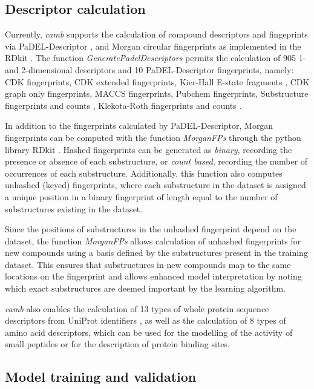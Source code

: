 \documentclass{bioinfo}
\begin{document}
\subsection{Descriptor calculation} 

Currently, {\it camb} supports the calculation of compound descriptors and fingeprints via PaDEL-Descriptor \citep{padel},
and Morgan circular fingerprints \citep{extended_fp} as implemented in the RDkit \citep{rdkit}.
The function {\it GeneratePadelDescriptors} permits the calculation of 905 1- and 2-dimensional descriptors and 10 PaDEL-Descriptor fingerprints, namely: 
CDK fingerprints, CDK extended fingerprints, Kier-Hall E-state fragments \cite{state_fp}, CDK graph only fingerprints, MACCS fingerprints,
Pubchem fingerprints, Substructure fingerprints and counts \citep{obabel}, Klekota-Roth fingerprints and counts \citep{privileged_substructures}.

In addition to the fingerprints calculated by PaDEL-Descriptor, Morgan fingerprints can be computed with the function {\it MorganFPs} through the python library RDkit \citep{rdkit}.
Hashed fingerprints can be generated as \textit{binary}, recording the presence or absence of each substructure,
 or \textit{count based}, recording the number of occurrences of each substructure.
Additionally, this function also computes unhashed (keyed) fingerprints, 
where each substructure in the dataset is assigned a unique position in a binary fingerprint of length equal to the number of substructures existing in the dataset.

Since the positions of substructures in the unhashed fingerprint depend on the dataset, the function {\it MorganFPs} allows calculation of unhashed fingerprints for new compounds using a basis defined by the substructures present in the training dataset. This ensures that substructures in new compounds map to the same locations on the fingerprint and allows enhanced model interpretation by noting which exact substructures are deemed important by the learning algorithm.

{\it camb} also enables the calculation of 13 types of whole protein sequence descriptors
from UniProt identifiers \citep{protr},
as well as the calculation of 8 types of amino acid descriptors,
which can be used for the modelling of the activity of small peptides
or for the description of protein binding sites\citep{AA_benchmark}.

\subsection{Model training and validation}
\end{document}
